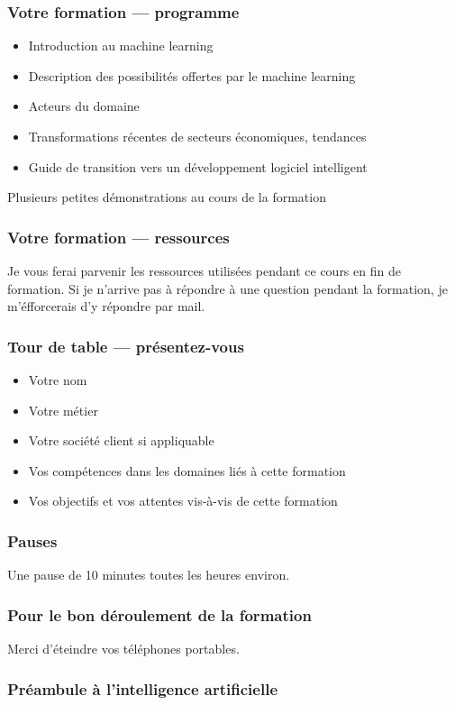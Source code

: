 \documentclass{formation}
\begin{document}
\begin{frame}
  \frametitle{Votre formation — programme}
  \begin{itemize}
  \item Introduction au machine learning
  \item Description des possibilités offertes par le machine learning 
  \item Acteurs du domaine
  \item Transformations récentes de secteurs économiques, tendances
  \item Guide de transition vers un développement logiciel intelligent
  \end{itemize}
  Plusieurs petites démonstrations au cours de la formation

\end{frame}

\begin{frame}
  \frametitle{Votre formation — ressources}
  Je vous ferai parvenir les ressources utilisées pendant ce cours en fin de formation.
  Si je n'arrive pas à répondre à une question pendant la formation, je m'éfforcerais d'y répondre par mail.
\end{frame}

\begin{frame}
  \frametitle{Tour de table — présentez-vous}

  \begin{itemize}
  \item Votre nom
  \item Votre métier
  \item Votre société client si appliquable
  \item Vos compétences dans les domaines liés à cette formation
  \item Vos objectifs et vos attentes vis-à-vis de cette formation
  \end{itemize}
\end{frame}

\begin{frame}
  \frametitle{Pauses}
  Une pause de 10 minutes toutes les heures environ.
\end{frame}

\begin{frame}
  \frametitle{Pour le bon déroulement de la formation}
  Merci d'éteindre vos téléphones portables.
\end{frame}

\begin{frame}
  \frametitle{Préambule à l'intelligence artificielle}
  \begin{center}
    \huge{}
  \end{center}
\end{frame}
\end{document}
